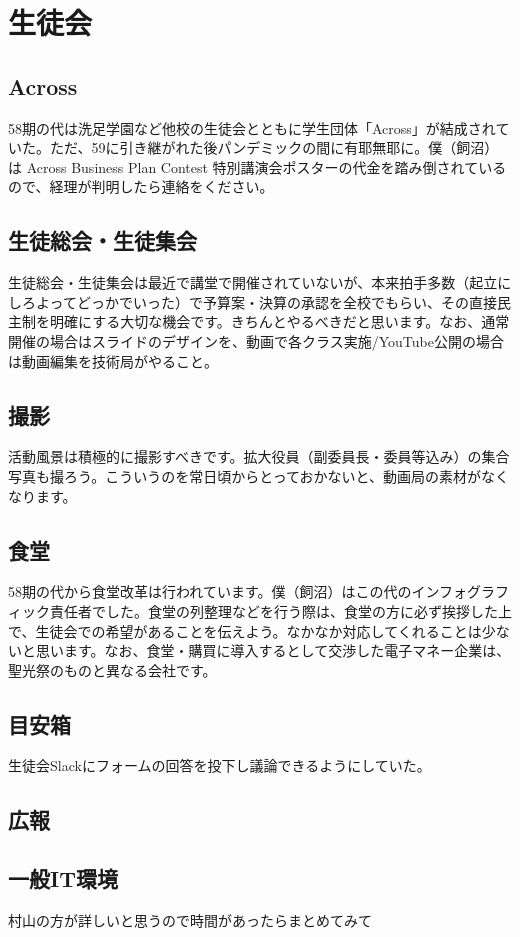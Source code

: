 \documentclass[a4paper]{ltjsreport}
\newcommand{\Chapter}[1]{\chapter{#1}\thispagestyle{fancy}}
\begin{document}
\Chapter{生徒会}
\section{Across}
58期の代は洗足学園など他校の生徒会とともに学生団体「Across」が結成されていた。ただ、59に引き継がれた後パンデミックの間に有耶無耶に。僕（飼沼）は Across Business Plan Contest 特別講演会ポスターの代金を踏み倒されているので、経理が判明したら連絡をください。

\section{生徒総会・生徒集会}
生徒総会・生徒集会は最近で講堂で開催されていないが、本来拍手多数（起立にしろよってどっかでいった）で予算案・決算の承認を全校でもらい、その直接民主制を明確にする大切な機会です。きちんとやるべきだと思います。なお、通常開催の場合はスライドのデザインを、動画で各クラス実施/YouTube公開の場合は動画編集を技術局がやること。

\section{撮影}
活動風景は積極的に撮影すべきです。拡大役員（副委員長・委員等込み）の集合写真も撮ろう。こういうのを常日頃からとっておかないと、動画局の素材がなくなります。

\section{食堂}
58期の代から食堂改革は行われています。僕（飼沼）はこの代のインフォグラフィック責任者でした。食堂の列整理などを行う際は、食堂の方に必ず挨拶した上で、生徒会での希望があることを伝えよう。なかなか対応してくれることは少ないと思います。なお、食堂・購買に導入するとして交渉した電子マネー企業は、聖光祭のものと異なる会社です。

\section{目安箱}
生徒会Slackにフォームの回答を投下し議論できるようにしていた。

\section{広報}
\section{一般IT環境}
村山の方が詳しいと思うので時間があったらまとめてみて
\end{document}
